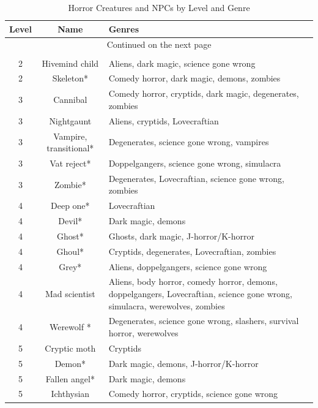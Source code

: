 \begin{longtable}{|c|c|X|}
\caption{Horror Creatures and NPCs by Level and Genre} \label{tab:Horror Creatures and NPCs by Level and Genre}\\
\hline
\textbf{Level} & \textbf{Name} & \textbf{Genres} \\
\hline
\endhead

\multicolumn{3}{|c|}{Continued on the next page} \\
\endfoot

\multicolumn{3}{|c|}{End of table} \\
\endlastfoot

2 & Hivemind child & Aliens, dark magic, science gone wrong \\ \hline
2 & Skeleton* & Comedy horror, dark magic, demons, zombies \\ \hline
3 & Cannibal & Comedy horror, cryptids, dark magic, degenerates, zombies \\ \hline
3 & Nightgaunt & Aliens, cryptids, Lovecraftian \\ \hline
3 & Vampire, transitional* & Degenerates, science gone wrong, vampires \\ \hline
3 & Vat reject* & Doppelgangers, science gone wrong, simulacra \\ \hline
3 & Zombie* & Degenerates, Lovecraftian, science gone wrong, zombies \\ \hline
4 & Deep one* & Lovecraftian \\ \hline
4 & Devil* & Dark magic, demons \\ \hline
4 & Ghost* & Ghosts, dark magic, J-horror/K-horror \\ \hline
4 & Ghoul* & Cryptids, degenerates, Lovecraftian, zombies \\ \hline
4 & Grey* & Aliens, doppelgangers, science gone wrong \\ \hline
4 & Mad scientist & Aliens, body horror, comedy horror, demons, doppelgangers, Lovecraftian, science gone wrong, simulacra, werewolves, zombies \\ \hline
4 & Werewolf * & Degenerates, science gone wrong, slashers, survival horror, werewolves \\ \hline
5 & Cryptic moth & Cryptids \\ \hline
5 & Demon* & Dark magic, demons, J-horror/K-horror \\ \hline
5 & Fallen angel* & Dark magic, demons \\ \hline
5 & Ichthysian & Comedy horror, cryptids, science gone wrong \\ \hline

\end{longtable}
